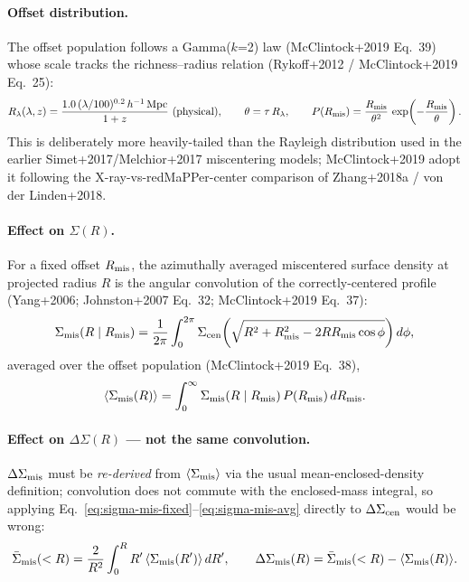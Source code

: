 \documentclass[a4paper, 11pt]{article}
\newcommand{\hMpc}{h^{-1}\,\mathrm{Mpc}}
\begin{document}
\paragraph{Offset distribution.} The offset population follows a
Gamma($k$=2) law (McClintock+2019 Eq.~39) whose scale tracks the
richness--radius relation (Rykoff+2012 / McClintock+2019 Eq.~25):
\begin{equation}
\label{eq:rlambda}
  R_\lambda(\lambda, z) = \frac{1.0\,(\lambda/100)^{0.2}\,\hMpc}{1+z}
  \ \text{(physical)},\qquad
  \theta = \tau\,R_\lambda,\qquad
  P(R_{\rm mis}) = \frac{R_{\rm mis}}{\theta^2}\,\exp\!\left(-\frac{R_{\rm mis}}{\theta}\right).
\end{equation}
This is deliberately more heavily-tailed than the Rayleigh distribution
used in the earlier Simet+2017/Melchior+2017 miscentering models;
McClintock+2019 adopt it following the X-ray-vs-redMaPPer-center
comparison of Zhang+2018a / von der Linden+2018.

\paragraph{Effect on $\Sigma(R)$.} For a fixed offset $R_{\rm mis}$, the
azimuthally averaged miscentered surface density at projected radius $R$
is the angular convolution of the correctly-centered profile
(Yang+2006; Johnston+2007 Eq.~32; McClintock+2019 Eq.~37):
\begin{equation}
\label{eq:sigma-mis-fixed}
  \Sigma_{\rm mis}(R \mid R_{\rm mis})
  = \frac{1}{2\pi}\int_0^{2\pi}
    \Sigma_{\rm cen}\!\left(\sqrt{R^2 + R_{\rm mis}^2 - 2RR_{\rm mis}\cos\phi}\right) d\phi,
\end{equation}
averaged over the offset population (McClintock+2019 Eq.~38),
\begin{equation}
\label{eq:sigma-mis-avg}
  \langle\Sigma_{\rm mis}(R)\rangle
  = \int_0^\infty \Sigma_{\rm mis}(R \mid R_{\rm mis})\,P(R_{\rm mis})\,dR_{\rm mis}.
\end{equation}

\paragraph{Effect on $\Delta\Sigma(R)$ --- not the same convolution.}
$\Delta\Sigma_{\rm mis}$ must be \emph{re-derived} from
$\langle\Sigma_{\rm mis}\rangle$ via the usual mean-enclosed-density
definition; convolution does not commute with the enclosed-mass integral,
so applying Eq.~\eqref{eq:sigma-mis-fixed}--\eqref{eq:sigma-mis-avg}
directly to $\Delta\Sigma_{\rm cen}$ would be wrong:
\begin{equation}
\label{eq:dsigma-from-sigma}
  \bar\Sigma_{\rm mis}(<R) = \frac{2}{R^2}\int_0^R R'\,
    \langle\Sigma_{\rm mis}(R')\rangle\,dR',\qquad
  \Delta\Sigma_{\rm mis}(R) = \bar\Sigma_{\rm mis}(<R) - \langle\Sigma_{\rm mis}(R)\rangle.
\end{equation}
\end{document}
